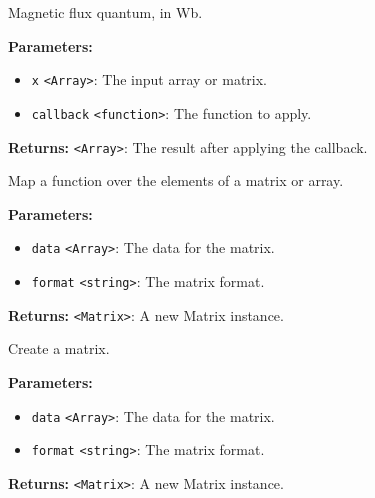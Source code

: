 \documentclass[12pt,a4paper]{article}
\begin{document}
\noindent Magnetic flux quantum, in Wb.

\vspace{5mm}
\noindent {}


\noindent \textbf{Parameters:}
\begin{itemize}
  \item \texttt{x} \texttt{<Array>}: The input array or matrix.
  \item \texttt{callback} \texttt{<function>}: The function to apply.
\end{itemize}

\noindent \textbf{Returns:} \texttt{<Array>}: The result after applying the callback.

\noindent Map a function over the elements of a matrix or array.

\vspace{5mm}
\noindent {}


\noindent \textbf{Parameters:}
\begin{itemize}
  \item \texttt{data} \texttt{<Array>}: The data for the matrix.
  \item \texttt{format} \texttt{<string>}: The matrix format.
\end{itemize}

\noindent \textbf{Returns:} \texttt{<Matrix>}: A new Matrix instance.

\noindent Create a matrix.

\vspace{5mm}
\noindent {}


\noindent \textbf{Parameters:}
\begin{itemize}
  \item \texttt{data} \texttt{<Array>}: The data for the matrix.
  \item \texttt{format} \texttt{<string>}: The matrix format.
\end{itemize}

\noindent \textbf{Returns:} \texttt{<Matrix>}: A new Matrix instance.
\end{document}
